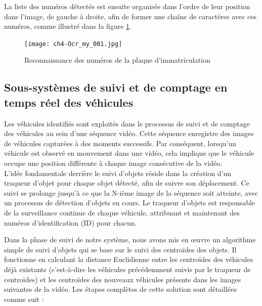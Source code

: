 La liste des numéros détectés est ensuite organisée dans l'ordre de leur position dans l'image, de gauche à droite, afin de former une chaîne de caractères avec ces numéros, comme illustré dans la figure \ref{fig:ch4-Ocr_my_001}.
\begin{figure}[H]
	\centering
	\texttt{[image: ch4-Ocr\_my\_001.jpg]}
	\caption{ Reconnaissance des numéros de la plaque d'immatriculation}
    \label{fig:ch4-Ocr_my_001}
\end{figure}

\subsection{Sous-systèmes de suivi et de comptage en temps réel des véhicules}\label{sec:traking}


Les véhicules identifiés sont exploités dans le processus de suivi et de comptage des véhicules au sein d'une séquence vidéo. Cette séquence enregistre des images de véhicules capturées à des moments successifs. Par conséquent, lorsqu'un véhicule est observé en mouvement dans une vidéo, cela implique que le véhicule occupe une position différente à chaque image consécutive de la vidéo.
\\
L'idée fondamentale derrière le suivi d'objets réside dans la création d'un traqueur d'objet pour chaque objet détecté, afin de suivre son déplacement. Ce suivi se prolonge jusqu'à ce que la N-ième image de la séquence soit atteinte, avec un processus de détection d'objets en cours. Le traqueur d'objets est responsable de la surveillance continue de chaque véhicule, attribuant et maintenant des numéros d'identification (ID) pour chacun.

Dans la phase de suivi de notre système, nous avons mis en œuvre un algorithme simple de suivi d'objets qui se base sur le suivi des centroïdes des objets. Il fonctionne en calculant la distance Euclidienne entre les centroïdes des véhicules déjà existants (c'est-à-dire les véhicules précédemment suivis par le traqueur de centroïdes) et les centroïdes des nouveaux véhicules présents dans les images suivantes de la vidéo. Les étapes complètes de cette solution sont détaillées comme suit :

